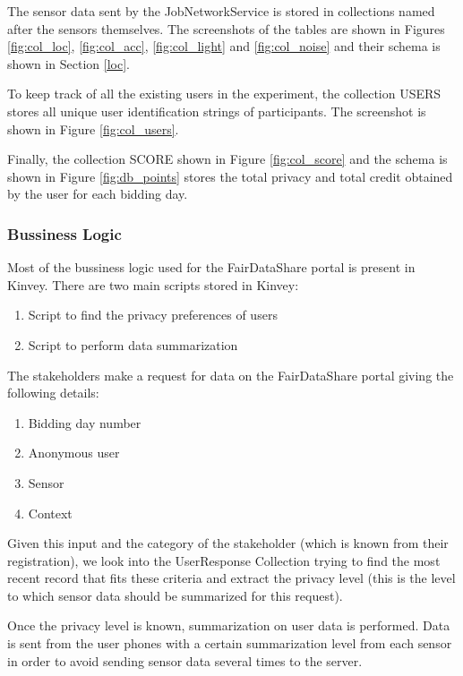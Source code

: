 The sensor data sent by the JobNetworkService is stored in collections named after the sensors themselves. The screenshots of the tables
are shown in Figures \ref{fig:col_loc}, \ref{fig:col_acc}, \ref{fig:col_light} and \ref{fig:col_noise} and their schema is shown in Section \ref{loc}.

To keep track of all the existing users in the experiment, the collection USERS stores all unique user identification strings of participants.
The screenshot is shown in Figure \ref{fig:col_users}.

Finally, the collection SCORE shown in Figure \ref{fig:col_score} and the schema is shown in Figure \ref{fig:db_points} stores the total privacy and total credit obtained by the user for each bidding day.

\subsubsection{Bussiness Logic} \label{bl}
Most of the bussiness logic used for the FairDataShare portal is present in Kinvey. There are two main scripts stored in Kinvey:

\begin{enumerate}
    \item Script to find the privacy preferences of users
    \item Script to perform data summarization
\end{enumerate}

The stakeholders make a request for data on the FairDataShare portal giving the following details:

\begin{enumerate}
    \item Bidding day number
    \item Anonymous user
    \item Sensor
    \item Context
\end{enumerate}

Given this input and the category of the stakeholder (which is known from their registration), we look into the UserResponse Collection trying to find the most recent record that
fits these criteria and extract the privacy level (this is the level to which sensor data should be summarized for this request).

Once the privacy level is known, summarization on user data is performed. Data is sent from the user phones with a certain summarization level from each sensor in order to avoid sending sensor data several times to the server. 

